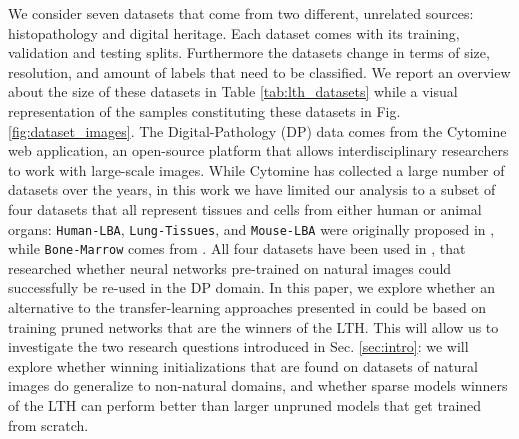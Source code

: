 We consider seven datasets that come from two different, unrelated sources: histopathology and digital heritage. Each dataset comes with its training, validation and testing splits. Furthermore the datasets change in terms of size, resolution, and amount of labels that need to be classified.
We report an overview about the size of these datasets in Table \ref{tab:lth_datasets} while a visual representation of the samples constituting these datasets in Fig. \ref{fig:dataset_images}.
The Digital-Pathology (DP) data comes from the Cytomine \cite{maree2016collaborative} web application, an open-source platform that allows interdisciplinary researchers to work with large-scale images. While Cytomine has collected a large number of datasets over the years, in this work we have limited our analysis to a subset of four datasets that all represent tissues and cells from either human or animal organs: \texttt{Human-LBA}, \texttt{Lung-Tissues}, and \texttt{Mouse-LBA} were originally proposed in \cite{mormont2018comparison}, while \texttt{Bone-Marrow} comes from \cite{kainz2017training}. All four datasets have been used in \cite{mormont2018comparison}, that researched whether neural networks pre-trained on natural images could successfully be re-used in the DP domain. In this paper, we explore whether an alternative to the transfer-learning approaches presented in \cite{mormont2018comparison} could be based on training pruned networks that are the winners of the LTH. This will allow us to investigate the two research questions introduced in Sec. \ref{sec:intro}: we will explore whether winning initializations that are found on datasets of natural images do generalize to non-natural domains, and whether sparse models winners of the LTH can perform better than larger unpruned models that get trained from scratch. 
